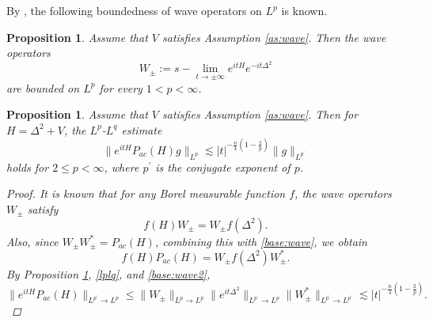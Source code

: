 \documentclass[11pt,a4paper]{article}
\numberwithin{equation}{section}
\newtheorem{proposition}[theorem]{Proposition}
\begin{document}
By \cite{Burak}, the following boundedness of wave operators on $L^{p}$ is known.
\begin{proposition}\label{wave bounded}
Assume that $V$ satisfies Assumption \ref{as:wave}. Then the wave operators
\begin{equation}
W_{\pm} := s - \lim_{t \rightarrow \pm \infty} e^{itH}e^{-it\Delta^{2}}
\end{equation}
are bounded on $L^{p}$ for every $1 < p < \infty$.
\end{proposition}

\begin{proposition}\label{prop:lp-lq}
Assume that $V$ satisfies Assumption \ref{as:wave}. Then for $H = \Delta^{2} + V$, the $L^{p}$-$L^{q}$ estimate
\begin{equation}\label{lplq for H}
\|e^{itH}P_{ac}(H)g\|_{L^{p}} \lesssim |t|^{-\frac{n}{4}(1 - \frac{2}{p})}\|g\|_{L^{p^{\prime}}}
\end{equation}
holds for $2 \leq p < \infty$, where $p^{\prime}$ is the conjugate exponent of $p$.
\begin{proof}
It is known that for any Borel measurable function $f$, the wave operators $W_{\pm}$ satisfy
\begin{equation}\label{base:wave}
f(H)W_{\pm} = W_{\pm}f(\Delta^{2}).
\end{equation}
Also, since $W_{\pm}W_{\pm}^{*} = P_{ac}(H)$, combining this with \eqref{base:wave}, we obtain
\begin{equation}\label{base:wave2}
f(H)P_{ac}(H) = W_{\pm}f(\Delta^{2})W_{\pm}^{*}.
\end{equation}
By Proposition \ref{wave bounded}, \eqref{lplq}, and \eqref{base:wave2},
\[ \|e^{itH}P_{ac}(H)\|_{L^{p^{\prime}}\rightarrow L^{p}} \leq \|W_{\pm}\|_{L^{p}\rightarrow L^{p}}\|e^{it\Delta^{2}}\|_{L^{p^{\prime}}\rightarrow L^{p}}\|W_{\pm}^{*}\|_{L^{p^{\prime}}\rightarrow L^{p^{\prime}}} \lesssim |t|^{-\frac{n}{4}(1 - \frac{2}{p})}. \]
\end{proof}
\end{proposition}
\end{document}

